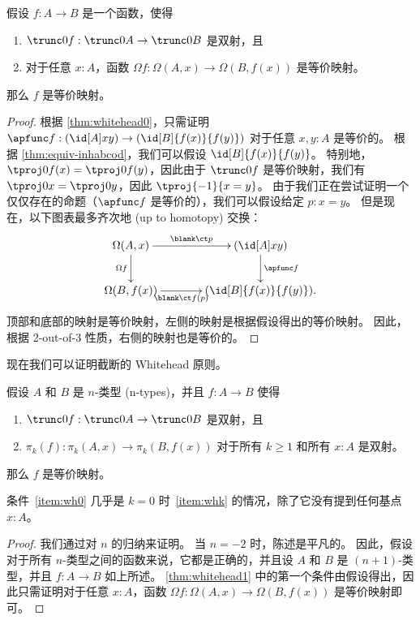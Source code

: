 {\begin{cor}\label{thm:whitehead1}
假设 $f:A\to B$ 是一个函数，使得
\begin{enumerate}
  \item $\trunc0 f : \trunc0 A \to \trunc0 B$ 是双射，且
  \item 对于任意 $x:A$，函数 $\Omega f : \Omega(A,x) \to \Omega(B,f(x))$ 是等价映射。
\end{enumerate}
那么 $f$ 是等价映射。
\end{cor}
\begin{proof}
  根据 \cref{thm:whitehead0}，只需证明 $\apfunc f : (\id[A]xy) \to (\id[B]{f(x)}{f(y)})$ 对于任意 $x,y:A$ 是等价的。
  根据 \cref{thm:equiv-inhabcod}，我们可以假设 $\id[B]{f(x)}{f(y)}$。
  特别地，$\tproj0{f(x)} = \tproj0{f(y)}$，因此由于 $\trunc0 f$ 是等价映射，我们有 $\tproj0 x = \tproj0y$，因此 $\tproj{-1}{x=y}$。
  由于我们正在尝试证明一个仅仅存在的命题（$\apfunc f$ 是等价的），我们可以假设给定 $p:x=y$。
  但是现在，以下图表最多齐次地 (up to homotopy) 交换：
  \begin{equation*}
    \vcenter{\xymatrix@C=3pc{
      \Omega(A,x)\ar[r]^-{\blank\ct p}\ar[d]_{\Omega f} &
      (\id[A]xy) \ar[d]^{\apfunc f}\\
      \Omega(B,f(x))\ar[r]_-{\blank\ct f(p)} &
      (\id[B]{f(x)}{f(y)}).
    }}
  \end{equation*}
  顶部和底部的映射是等价映射，左侧的映射是根据假设得出的等价映射。
  因此，根据 2-out-of-3 性质，右侧的映射也是等价的。
\end{proof}

现在我们可以证明截断的 Whitehead 原则。

\begin{thm}\label{thm:whiteheadn}
假设 $A$ 和 $B$ 是 $n$-类型 (n-types)，并且 $f:A\to B$ 使得
\begin{enumerate}
  \item $\trunc0f:\trunc0A \to \trunc0B$ 是双射，且\label{item:wh0}
  \item $\pi_k(f):\pi_k(A,x) \to \pi_k(B,f(x))$ 对于所有 $k\ge 1$ 和所有 $x:A$ 是双射。\label{item:whk}
\end{enumerate}
那么 $f$ 是等价映射。
\end{thm}

\noindent
条件~\ref{item:wh0} 几乎是 $k=0$ 时~\ref{item:whk} 的情况，除了它没有提到任何基点 $x:A$。

\begin{proof}
  我们通过对 $n$ 的归纳来证明。
  当 $n=-2$ 时，陈述是平凡的。
  因此，假设对于所有 $n$-类型之间的函数来说，它都是正确的，并且设 $A$ 和 $B$ 是 $(n+1)$-类型，并且 $f:A\to B$ 如上所述。
  \cref{thm:whitehead1} 中的第一个条件由假设得出，因此只需证明对于任意 $x:A$，函数 $\Omega f: \Omega(A,x) \to \Omega(B,f(x))$ 是等价映射即可。


\end{proof}}
